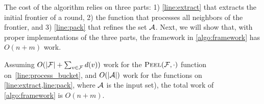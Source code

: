 The cost of the algorithm relies on three parts: 1) \cref{line:extract} that extracts the initial frontier of a round, 2) the \FPeel{} function that processes all neighbors of the frontier, and 3) \cref{line:pack} that refines the \alive{} set ${\mathcal{A}}$. 
Next, we will show that, with proper implementations of the three parts, the framework in \cref{algo:framework} has $O(n+m)$ work. 

\begin{theorem}
    \label{thm:work}
        Assuming $O(|{\mathcal{F}}|+\sum_{v\in {\mathcal{F}}}{d(v)})$ work for the ${\mbox{\sc{Peel}}}({\mathcal{F}},\cdot)$ function on~\cref{line:process_bucket}, and
        $O(|{\mathcal{A}}|)$ work for the functions on \cref{line:extract,line:pack}, where ${\mathcal{A}}$ is the input \alive{} set), 
        the total work of \cref{algo:framework} is $O(n+m)$.
\end{theorem}
